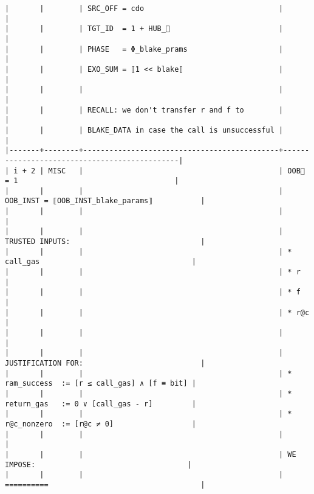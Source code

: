 \documentclass[varwidth=\maxdimen,margin=0.5cm,multi={verbatim}]{standalone}
\begin{document}
\begin{verbatim}
|       |        | SRC_OFF = cdo                               |                                              |
|       |        | TGT_ID  = 1 + HUB_                         |                                              |
|       |        | PHASE   = Φ_blake_prams                     |                                              |
|       |        | EXO_SUM = ⟦1 << blake⟧                      |                                              |
|       |        |                                             |                                              |
|       |        | RECALL: we don't transfer r and f to        |                                              |
|       |        | BLAKE_DATA in case the call is unsuccessful |                                              |
|-------+--------+---------------------------------------------+----------------------------------------------|
| i + 2 | MISC   |                                             | OOB🏴 = 1                                    |
|       |        |                                             | OOB_INST = ⟦OOB_INST_blake_params⟧           |
|       |        |                                             |                                              |
|       |        |                                             | TRUSTED INPUTS:                              |
|       |        |                                             | * call_gas                                   |
|       |        |                                             | * r                                          |
|       |        |                                             | * f                                          |
|       |        |                                             | * r@c                                        |
|       |        |                                             |                                              |
|       |        |                                             | JUSTIFICATION FOR:                           |
|       |        |                                             | * ram_success  := [r ≤ call_gas] ∧ [f ≡ bit] |
|       |        |                                             | * return_gas   := 0 ∨ [call_gas - r]         |
|       |        |                                             | * r@c_nonzero  := [r@c ≠ 0]                  |
|       |        |                                             |                                              |
|       |        |                                             | WE IMPOSE:                                   |
|       |        |                                             | ==========                                   |

\end{verbatim}
\end{document}
